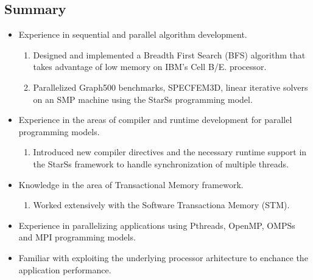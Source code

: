 \documentclass[margin]{res}
\begin{document}
 
 
 
\address{
 Skype\ :\ rahulkumar.gayatri\\
 email\ :\ rahulgayatri84@gmail.com\\
 phone-number\ :\ +91-7899423040
 }

 
\begin{resume} 
%
  \section{Summary}
  \begin{itemize}
%
	   \item  Experience in sequential and parallel algorithm development.
			 \begin{enumerate}
				    \item Designed and implemented a Breadth First Search (BFS) algorithm that takes advantage of low memory on IBM's Cell B/E. processor.
				    \item Parallelized Graph500 benchmarks, SPECFEM3D, linear iterative solvers on an SMP machine using the StarSs programming model.
			\end{enumerate}
%
	   \item Experience in the areas of compiler and runtime development for parallel programming models.
			 \begin{enumerate}
				    \item Introduced new compiler directives and the necessary runtime support in the StarSs framework to handle synchronization of multiple threads.
			 \end{enumerate}
%
	   \item Knowledge in the area of Transactional Memory framework.
			 \begin{enumerate}
				    \item Worked extensively with the Software Transactiona Memory (STM).
			 \end{enumerate}
%
	   \item Experience in parallelizing applications using Pthreads, OpenMP, OMPSs and MPI programming models.
	   \item Familiar with exploiting the underlying processor arhitecture to enchance the application performance.

\end{itemize}
\end{resume}
\end{document}
